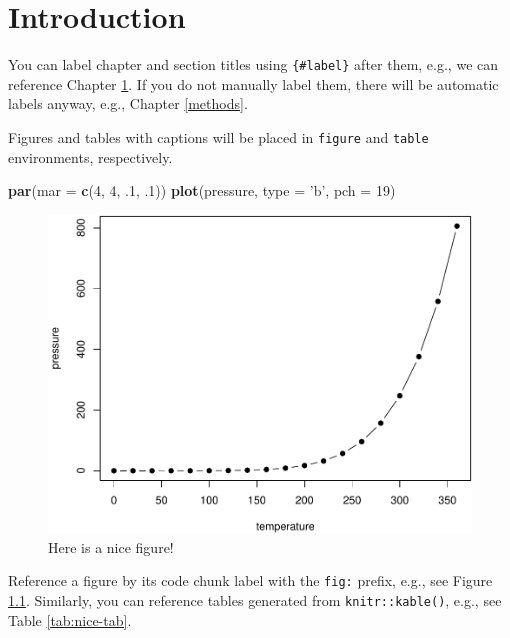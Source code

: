 \documentclass[]{book}
\newenvironment{Shaded}{\begin{snugshade}}{\end{snugshade}}
\newcommand{\KeywordTok}[1]{\textcolor[rgb]{0.13,0.29,0.53}{\textbf{#1}}}
\newcommand{\DataTypeTok}[1]{\textcolor[rgb]{0.13,0.29,0.53}{#1}}
\newcommand{\DecValTok}[1]{\textcolor[rgb]{0.00,0.00,0.81}{#1}}
\newcommand{\StringTok}[1]{\textcolor[rgb]{0.31,0.60,0.02}{#1}}
\newcommand{\NormalTok}[1]{#1}
\begin{document}
\chapter{Introduction}\label{intro}

You can label chapter and section titles using \texttt{\{\#label\}}
after them, e.g., we can reference Chapter \ref{intro}. If you do not
manually label them, there will be automatic labels anyway, e.g.,
Chapter \ref{methods}.

Figures and tables with captions will be placed in \texttt{figure} and
\texttt{table} environments, respectively.

\begin{Shaded}
\begin{Highlighting}[]
\KeywordTok{par}\NormalTok{(}\DataTypeTok{mar =} \KeywordTok{c}\NormalTok{(}\DecValTok{4}\NormalTok{, }\DecValTok{4}\NormalTok{, .}\DecValTok{1}\NormalTok{, .}\DecValTok{1}\NormalTok{))}
\KeywordTok{plot}\NormalTok{(pressure, }\DataTypeTok{type =} \StringTok{'b'}\NormalTok{, }\DataTypeTok{pch =} \DecValTok{19}\NormalTok{)}
\end{Highlighting}
\end{Shaded}

\begin{figure}

{\centering \includegraphics[width=0.8\linewidth]{bookdown-demo_files/figure-latex/nice-fig-1} 

}

\caption{Here is a nice figure!}\label{fig:nice-fig}
\end{figure}

Reference a figure by its code chunk label with the \texttt{fig:}
prefix, e.g., see Figure \ref{fig:nice-fig}. Similarly, you can
reference tables generated from \texttt{knitr::kable()}, e.g., see Table
\ref{tab:nice-tab}.
\end{document}
